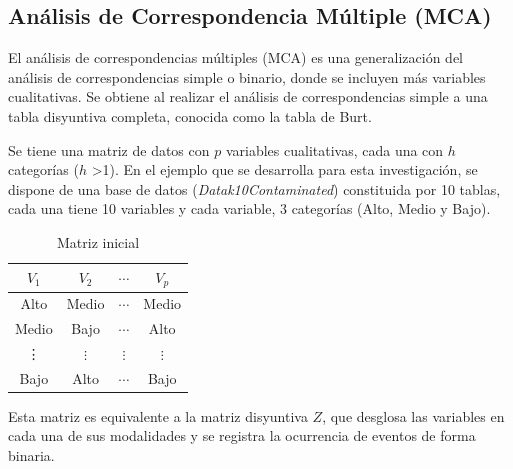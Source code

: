 \documentclass[water,article,submit,moreauthors,pdftex]{mdpi}
\begin{document}
\hypertarget{anuxe1lisis-de-correspondencia-muxfaltiple-mca}{%
\subsection{Análisis de Correspondencia Múltiple
(MCA)}\label{anuxe1lisis-de-correspondencia-muxfaltiple-mca}}

El análisis de correspondencias múltiples (MCA) es una generalización
del análisis de correspondencias simple o binario, donde se incluyen más
variables cualitativas. Se obtiene al realizar el análisis de
correspondencias simple a una tabla disyuntiva completa, conocida como
la tabla de Burt.

Se tiene una matriz de datos con \(p\) variables cualitativas, cada una
con \(h\) categorías (\(h\) \textgreater1). En el ejemplo que se
desarrolla para esta investigación, se dispone de una base de datos
(\emph{Datak10Contaminated}) constituida por 10 tablas, cada una tiene
10 variables y cada variable, 3 categorías (Alto, Medio y Bajo).

\begin{table}[!ht]
\begin{center}
 \begin{tabular}{||c c c c||} 
 \hline
 $V_{1}$ & $V_{2}$ & $\cdots$ & $V_{p}$ \\ [0.5ex] 
 \hline\hline
 Alto & Medio & $\cdots$ & Medio\\
 \hline
Medio & Bajo & $\cdots$ & Alto\\
\hline
\vdots & $\vdots$ & $\vdots$ & $\vdots$\\
\hline
Bajo & Alto & $\cdots$ & Bajo \\ [1ex] 
 \hline
\end{tabular}\caption{Matriz inicial}
\label{tab:inicial}
\end{center}
\end{table}

Esta matriz es equivalente a la matriz disyuntiva \(Z\), que desglosa
las variables en cada una de sus modalidades y se registra la ocurrencia
de eventos de forma binaria.
\end{document}
